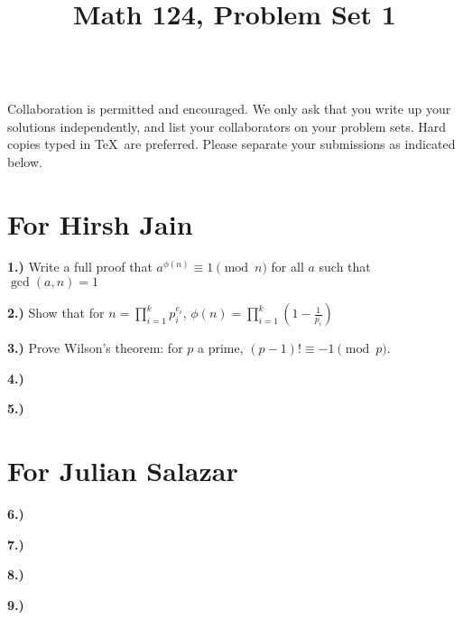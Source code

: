 \documentclass[10pt]{amsart}
\title{Math 124, Problem Set 1}
\begin{document}
\maketitle

\\
 Collaboration is permitted and encouraged. We only ask that you write up your solutions independently, and list your collaborators on your problem sets. Hard copies typed in \TeX\  are preferred. Please separate your submissions as indicated below.

\section*{For Hirsh Jain}

\medskip

{\bf 1.)} Write a full proof that $a^{\phi(n)} \equiv 1 \pmod n$ for all $a$ such that $\gcd(a,n) = 1$ 

\medskip

{\bf 2.)} Show that for $n = \prod_{i=1}^k p_i^{e_i}$, $\phi(n) = \prod_{i=1}^k \left(1 - \frac{1}{p_i}\right)$

\medskip

{\bf 3.)} Prove Wilson's theorem: for $p$ a prime, $(p-1)! \equiv -1 \pmod p$. 

\medskip


\medskip
{\bf 4.)} 


\medskip



{\bf 5.)} 

\medskip

\section*{For Julian Salazar}

\medskip

{\bf 6.)} 

\medskip


{\bf 7.)} 

\medskip


{\bf 8.)} 

\medskip

{\bf 9.)}
\end{document}

